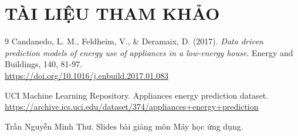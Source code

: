 \documentclass{article} %
\begin{document}
    \section*{TÀI LIỆU THAM KHẢO}
    \renewcommand{\refname}{}
    \vspace{-4em}
    \begin{thebibliography}{9}
        Candanedo, L. M., Feldheim, V., \& Deramaix, D. (2017). \textit{Data driven prediction models of energy use of appliances in a low-energy house}. Energy and Buildings, 140, 81-97.\\
        \url{https://doi.org/10.1016/j.enbuild.2017.01.083}
        
        UCI Machine Learning Repository. Appliances energy prediction dataset.\\
        \url{https://archive.ics.uci.edu/dataset/374/appliances+energy+prediction}
        
        Trần Nguyễn Minh Thư. Slides bài giảng môn Máy học ứng dụng.
    \end{thebibliography}
    
\end{document}
